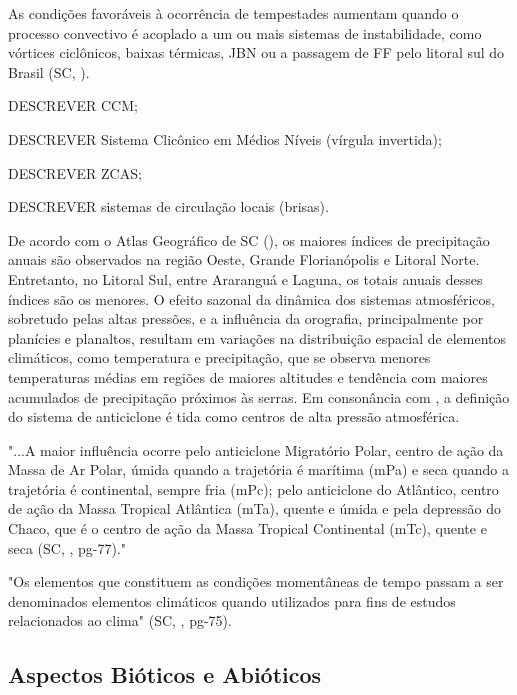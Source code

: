 \indent As condições favoráveis à ocorrência de tempestades aumentam quando o processo convectivo é acoplado a um ou mais sistemas de instabilidade, como vórtices ciclônicos, baixas térmicas, \acrfull{JBN} ou a passagem de \acrlong{FF} pelo litoral sul do Brasil (\acrlong{SC}, \citeyear{AtlasSCnatureza}).

DESCREVER \acrlong{CCM};

DESCREVER Sistema Clicônico em Médios Níveis (vírgula invertida);

DESCREVER \acrlong{ZCAS};

DESCREVER  sistemas de circulação locais (brisas).

\indent De acordo com o Atlas Geográfico de \acrlong{SC} (\citeyear{AtlasSCnatureza}), os maiores índices de precipitação anuais são observados na região Oeste, Grande Florianópolis e Litoral Norte. Entretanto, no Litoral Sul, entre Araranguá e Laguna, os totais anuais desses índices são os menores. O efeito sazonal da dinâmica dos sistemas atmosféricos, sobretudo pelas altas pressões, e a influência da orografia, principalmente por planícies e planaltos, resultam em variações na distribuição espacial de elementos climáticos, como temperatura e precipitação, que se observa menores temperaturas médias em regiões de maiores altitudes e tendência com maiores acumulados de precipitação próximos às serras. Em consonância com , a definição do sistema de anticiclone é tida como centros de alta pressão atmosférica.

\begin{citacao}
"...A maior influência ocorre pelo anticiclone Migratório Polar, centro de ação da Massa de Ar Polar, úmida quando a trajetória é marítima (mPa) e seca quando a trajetória é continental, sempre fria (mPc); pelo anticiclone do Atlântico, centro de ação da Massa Tropical Atlântica (mTa), quente e úmida e pela depressão do Chaco, que é o centro de ação da Massa Tropical Continental (mTc), quente e seca (\acrlong{SC}, \citeyear{AtlasSCnatureza}, pg-77)." 
\end{citacao}

\indent "Os elementos que constituem as condições momentâneas de tempo passam a ser denominados elementos climáticos quando utilizados para fins de estudos relacionados ao clima" (\acrlong{SC}, \citeyear{AtlasSCnatureza}, pg-75).

\subsection{Aspectos Bióticos e Abióticos}

